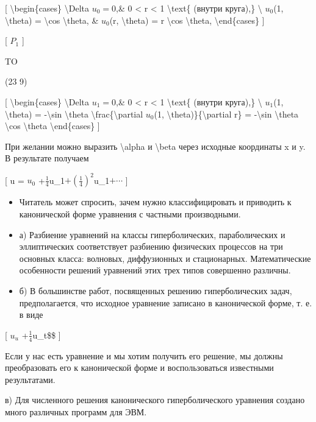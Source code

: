\documentclass[
]{article}
\begin{document}
{{{[} \textbackslash begin\{cases\} \textbackslash Delta \(u_{0} = 0\),\&
0 \textless{} r \textless{} 1 \textbackslash text\{ (внутри круга),\}
\textbackslash{} \(u_{0}\)(1, \textbackslash theta) = \textbackslash cos
\textbackslash theta, \& \(u_{0}\)(r, \textbackslash theta) = r
\textbackslash cos \textbackslash theta, \textbackslash end\{cases\} {]}

{[} \(P_{1}\) {]}

TO

(23 9)

{[} \textbackslash begin\{cases\} \textbackslash Delta \(u_{1} = 0\),\&
0 \textless{} r \textless{} 1 \textbackslash text\{ (внутри круга),\}
\textbackslash{} \(u_{1}\)(1, \textbackslash theta) =
-\textbackslash sin \textbackslash theta
\textbackslash frac\{\textbackslash partial \(u_{0}\)(1,
\textbackslash theta)\}\{\textbackslash partial r\} =
-\textbackslash sin \textbackslash theta \textbackslash cos
\textbackslash theta \textbackslash end\{cases\} {]}

При желании можно выразить \textbackslash alpha и \textbackslash beta
через исходные координаты x и y. В результате получаем

{[} u = \(u_0\)
+\(\frac{1}{4}\)u\_1\(+ \left(\frac{1}{4}\right)^2\)u\_1\(+ \cdots\) {]}

\begin{itemize}
\item
  Читатель может спросить, зачем нужно классифицировать и приводить к
  канонической форме уравнения с частными производными.
\item
  а) Разбиение уравнений на классы гиперболических, параболических и
  эллиптических соответствует разбиению физических процессов на три
  основных класса: волновых, диффузионных и стационарных. Математические
  особенности решений уравнений этих трех типов совершенно различны.
\item
  б) В большинстве работ, посвященных решению гиперболических задач,
  предполагается, что исходное уравнение записано в канонической форме,
  т. е. в виде
\end{itemize}

{[} \(u_u\) +\(\frac{1}{4}\)u\_t\$\$ {]}

Если у нас есть уравнение и мы хотим получить его решение, мы должны
преобразовать его к канонической форме и воспользоваться известными
результатами.

в) Для численного решения канонического гиперболического уравнения
создано много различных программ для ЭВМ.

}}
\end{document}

